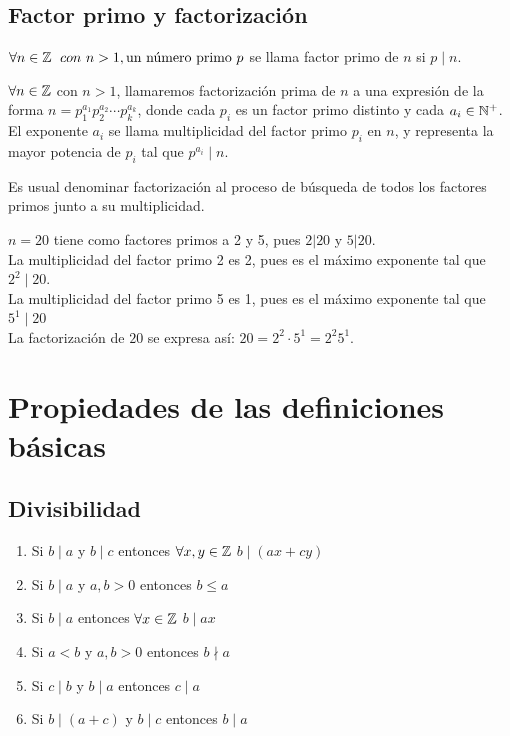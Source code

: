 \subsection{Factor primo y factorización}
\begin{definicion}\label{def:factorPprimo}
$\forall n \in \mathbb{Z} \; \ con \ n > 1, \text{un número primo} \ p$ se llama 
factor primo de $n$ si $p \mid n$.
\end{definicion}

\begin{definicion}\label{def:factorizacion}
$\forall n \in \mathbb{Z}$ \; con $n > 1$, llamaremos factorización prima de $n$ a una expresión de la forma $n = p_1^{a_1} p_2^{a_2} \cdots p_k^{a_k}$, donde cada $p_i$ es un factor primo distinto y cada $a_i \in \mathbb{N}^{+}$.  El exponente $a_i$ se llama multiplicidad del factor primo $p_i$ en $n$, y representa la mayor potencia de $p_i$ tal que $p^{a_i} \mid n$.
\end{definicion}

Es usual denominar factorización al proceso de búsqueda de todos los factores primos junto a su multiplicidad.

\begin{ejemplo}
$n = 20$ tiene como factores primos a 2 y 5, pues $2|20$ y $5|20$. \\
La multiplicidad del factor primo 2 es 2, pues es el máximo exponente tal que $2^{2} \mid 20$. \\
La multiplicidad del factor primo 5 es 1, pues es el máximo exponente tal que $5^{1} \mid 20$ \\
La factorización de $20$ se expresa así: $20 = 2^{2} \cdot 5^{1} = 2^{2}5^{1}$.
\end{ejemplo}

\section{Propiedades de las definiciones básicas}
\subsection{Divisibilidad}
\begin{enunciado}\label{enun:propDivisibilidad}\leavevmode\par
\begin{enumerate}[label=\roman*)]
\item Si $b \mid a$ \; y \; $b \mid c$ entonces $\forall x,y \in \mathbb{Z}$ \; $b \mid (ax + cy)$
\item Si $b \mid a$ \; y \; $a,b > 0$ entonces $b \leq a$
\item Si $b \mid a$ entonces $\forall x \in \mathbb{Z}$ \; $b \mid ax$
\item Si $a < b$ \; y \; $a,b > 0$ entonces $b \nmid a$
\item Si $c \mid b$ \; y \; $b \mid a$ entonces $c \mid a$
\item Si $b \mid (a+c)$ \; y \; $b \mid c$ entonces $b \mid a$
\end{enumerate}
\end{enunciado}

